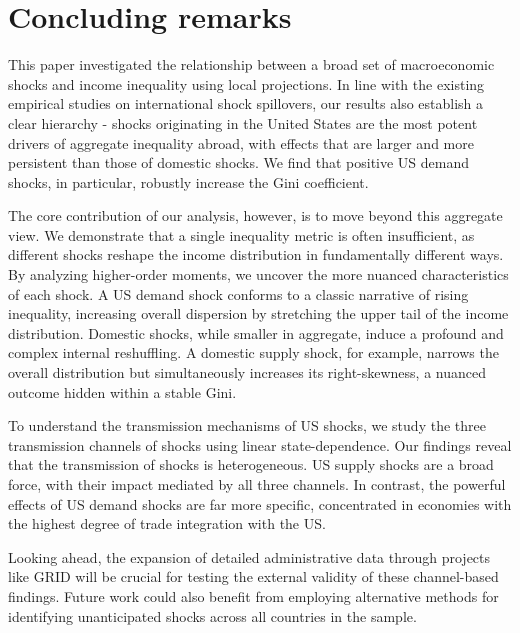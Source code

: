 \documentclass[12pt, a4paper]{article}
\begin{document}
\newpage
\section{Concluding remarks}
This paper investigated the relationship between a broad set of macroeconomic shocks and income inequality using local projections. In line with the existing empirical studies on international shock spillovers, our results also establish a clear hierarchy - shocks originating in the United States are the most potent drivers of aggregate inequality abroad, with effects that are larger and more persistent than those of domestic shocks. We find that positive US demand shocks, in particular, robustly increase the Gini coefficient.

The core contribution of our analysis, however, is to move beyond this aggregate view. We demonstrate that a single inequality metric is often insufficient, as different shocks reshape the income distribution in fundamentally different ways. By analyzing higher-order moments, we uncover the more nuanced characteristics of each shock. A US demand shock conforms to a classic narrative of rising inequality, increasing overall dispersion by stretching the upper tail of the income distribution. Domestic shocks, while smaller in aggregate, induce a profound and complex internal reshuffling. A domestic supply shock, for example, narrows the overall distribution but simultaneously increases its right-skewness, a nuanced outcome hidden within a stable Gini.

To understand the transmission mechanisms of US shocks, we study the three transmission channels of shocks using linear state-dependence. Our findings reveal that the transmission of shocks is heterogeneous. US supply shocks are a broad force, with their impact mediated by all three channels. In contrast, the powerful effects of US demand shocks are far more specific, concentrated in economies with the highest degree of trade integration with the US.

Looking ahead, the expansion of detailed administrative data through projects like GRID will be crucial for testing the external validity of these channel-based findings. Future work could also benefit from employing alternative methods for identifying unanticipated shocks across all countries in the sample.

\newpage
\printbibliography
\pagebreak
\end{document}
